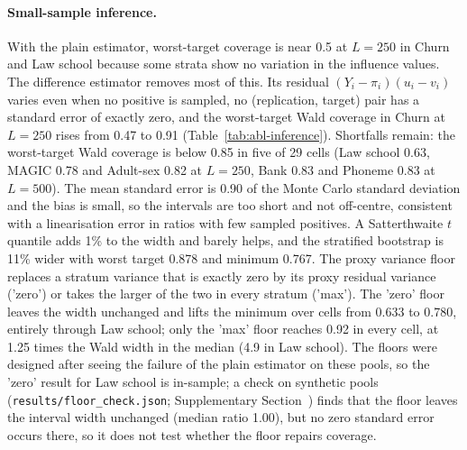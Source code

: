 \paragraph{Small-sample inference.} With the plain estimator, worst-target coverage is near 0.5 at $L=250$ in Churn and Law school because some strata show no variation in the influence values. The difference estimator removes most of this. Its residual $(Y_i-\pi_i)(u_i-v_i)$ varies even when no positive is sampled, no (replication, target) pair has a standard error of exactly zero, and the worst-target Wald coverage in Churn at $L=250$ rises from 0.47 to 0.91 (Table~\ref{tab:abl-inference}). Shortfalls remain: the worst-target Wald coverage is below 0.85 in five of 29 cells (Law school 0.63, MAGIC 0.78 and Adult-sex 0.82 at $L=250$, Bank 0.83 and Phoneme 0.83 at $L=500$). The mean standard error is 0.90 of the Monte Carlo standard deviation and the bias is small, so the intervals are too short and not off-centre, consistent with a linearisation error in ratios with few sampled positives. A Satterthwaite $t$ quantile adds 1\% to the width and barely helps, and the stratified bootstrap is 11\% wider with worst target 0.878 and minimum 0.767. The proxy variance floor replaces a stratum variance that is exactly zero by its proxy residual variance ('zero') or takes the larger of the two in every stratum ('max'). The 'zero' floor leaves the width unchanged and lifts the minimum over cells from 0.633 to 0.780, entirely through Law school; only the 'max' floor reaches 0.92 in every cell, at 1.25 times the Wald width in the median (4.9 in Law school). The floors were designed after seeing the failure of the plain estimator on these pools, so the 'zero' result for Law school is in-sample; a check on synthetic pools (\texttt{results/floor\_check.json}; Supplementary Section~) finds that the floor leaves the interval width unchanged (median ratio 1.00), but no zero standard error occurs there, so it does not test whether the floor repairs coverage.

